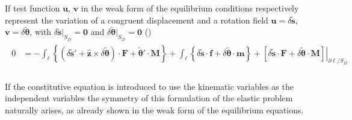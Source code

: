 \documentclass[letterpaper,10pt,english]{jupyterBook}
\begin{document}
\sphinxAtStartPar
If test function \(\mathbf{u}\), \(\mathbf{v}\) in the weak form of the equilibrium conditions respectively represent the variation of a congruent displacement and a rotation field \(\mathbf{u} = \delta \widetilde{\mathbf{s}}\), \(\mathbf{v} = \delta \widetilde{\boldsymbol\theta}\), with \(\delta \widetilde{\mathbf{s}}|_{S_D} = \mathbf{0}\) and \(\delta \widetilde{\boldsymbol\theta}|_{S_D} = \mathbf{0}\) ()
\begin{equation*}
\begin{split}\begin{aligned}
  0 
  & = - \int_{\ell} \left\{ ( \delta\widetilde{\mathbf{s}}' + \hat{\mathbf{z}} \times \delta\widetilde{\boldsymbol{\theta}} ) \cdot \mathbf{F} + \widetilde{\boldsymbol{\theta}}' \cdot \mathbf{M} \right\} + \int_{\ell} \left\{ \delta \widetilde{\mathbf{s}} \cdot \mathbf{f} + \delta \widetilde{\boldsymbol\theta} \cdot \mathbf{m} \right\} + \left. \left[ \delta \widetilde{\mathbf{s}} \cdot \mathbf{F} + \delta \widetilde{\boldsymbol{\theta}} \cdot \mathbf{M} \right] \right|_{\partial \ell / S_D} \\
\end{aligned}\end{split}
\end{equation*}
\sphinxAtStartPar
{} 

\sphinxAtStartPar
If the constitutive equation is introduced to use the kinematic variables as the independent variables the symmetry of this formulation of the elastic problem naturally arises, as already shown in the weak form of the equilibrium equations.
\end{document}

